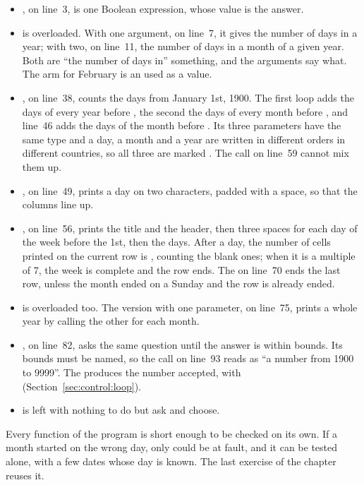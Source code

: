 \begin{itemize}
\item {}, on line~3, is one Boolean expression, whose value is
  the answer.
\item {} is overloaded. With one argument, on line~7, it gives the
  number of days in a year; with two, on line~11, the number of days in a month
  of a given year. Both are ``the number of days in'' something, and the
  arguments say what. The arm for February is an  used as a value.
\item {}, on line~38, counts the days from January 1st, 1900. The
  first loop adds the days of every year before , the second the days
  of every month before , and line~46 adds the days of the month
  before . Its three parameters have the same type and a day, a month
  and a year are written in different orders in different countries, so all
  three are marked . The call on line~59 cannot mix them up.
\item {}, on line~49, prints a day on two characters, padded with a
  space, so that the columns line up.
\item {}, on line~56, prints the title and the header, then
  three spaces for each day of the week before the 1st, then the days. After a
  day, the number of cells printed on the current row is ,
  counting the blank ones; when it is a multiple of 7, the week is complete and
  the row ends. The  on line~70 ends the last row, unless the month
  ended on a Sunday and the row is already ended.
\item {} is overloaded too. The version with one parameter,
  on line~75, prints a whole year by calling the other for each month.
\item {}, on line~82, asks the same question until the answer is
  within bounds. Its bounds must be named, so the call on line~93 reads as
  ``a number from 1900 to 9999''. The  produces the number accepted,
  with  (Section~\ref{sec:control:loop}).
\item {} is left with nothing to do but ask and choose.
\end{itemize}

Every function of the program is short enough to be checked on its own. If a
month started on the wrong day, only  could be at fault, and it
can be tested alone, with a few dates whose day is known. The last exercise of
the chapter reuses it.
